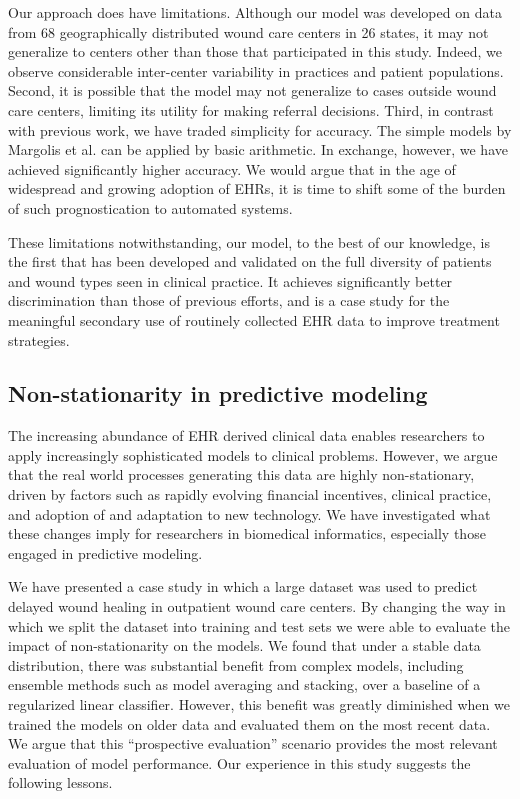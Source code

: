 Our approach does have limitations. Although our model was developed
on data from 68 geographically distributed wound care centers in 26
states, it may not generalize to centers other than those that
participated in this study.  Indeed, we observe considerable
inter-center variability in practices and patient populations.
Second, it is possible that the model may not generalize to cases
outside wound care centers, limiting its utility for making referral
decisions.  Third, in contrast with previous work, we have traded
simplicity for accuracy.  The simple models by Margolis et al. can be
applied by basic arithmetic.  In exchange, however, we have achieved
significantly higher accuracy.  We would argue that in the age of
widespread and growing adoption of EHRs, it is time to shift some of
the burden of such prognostication to automated systems.

These limitations notwithstanding, our model, to the best of our
knowledge, is the first that has been developed and validated on the
full diversity of patients and wound types seen in clinical practice.
It achieves significantly better discrimination than those of previous
efforts, and is a case study for the meaningful secondary use of
routinely collected EHR data to improve treatment strategies.

\subsection{Non-stationarity in predictive modeling}
The increasing abundance of EHR derived clinical data enables
researchers to apply increasingly sophisticated models to clinical
problems.  However, we argue that the real world processes generating
this data are highly non-stationary, driven by factors such as rapidly
evolving financial incentives, clinical practice, and adoption of and
adaptation to new technology.  We have investigated what these changes
imply for researchers in biomedical informatics, especially those
engaged in predictive modeling.

We have presented a case study in which a large dataset was used to
predict delayed wound healing in outpatient wound care centers.  By
changing the way in which we split the dataset into training and test
sets we were able to evaluate the impact of non-stationarity on the
models.  We found that under a stable data distribution, there was
substantial benefit from complex models, including ensemble methods
such as model averaging and stacking, over a baseline of a regularized
linear classifier.  However, this benefit was greatly diminished when
we trained the models on older data and evaluated them on the most
recent data.  We argue that this “prospective evaluation” scenario
provides the most relevant evaluation of model performance.  Our
experience in this study suggests the following lessons.

